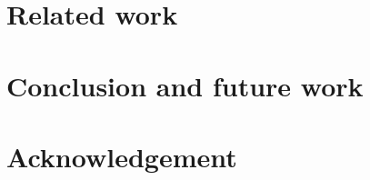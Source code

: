 \documentclass{sig-alternate}
\begin{document}
 
 
 


\section{Related work}
\label{sec:related}

\section{Conclusion and future work}
\label{sec:concfut}

\section{Acknowledgement}

%
%
%
%
\end{document}
